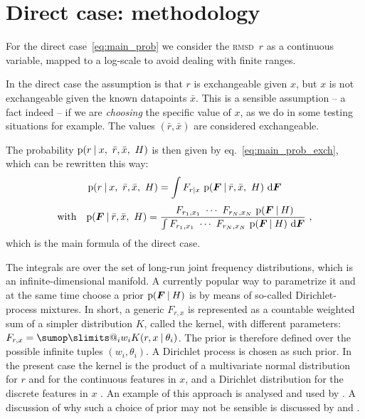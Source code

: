 \documentclass[\ifafour a4paper,12pt,\else a5paper,10pt,\fi%
onecolumn,oneside,article,%
british%
]{memoir}
\makeatletter
\theoremstyle{remark}
\theoremstyle{innote}
\def\sum{\DOTSI\sumop\slimits@}
\newcommand*{\di}{\mathrm{d}}%
\newcommand*{\p}{\mathrm{p}}%
\renewcommand*{\|}[1][]{\nonscript\:#1\vert\nonscript\:\mathopen{}}
\renewcommand*{\=}{\TextOrMath\texteq\eq}
\newcommand*{\sect}{\S}%
\newcommand*{\eqn}{eq.}%
\newcommand*{\rmsd}{\textsc{rmsd}}
\newcommand*{\ro}{r}
\newcommand*{\xo}{x}
\newcommand*{\br}{\bar{r}}
\newcommand*{\bx}{\bar{x}}
\newcommand*{\yF}{\bm{F}}
\makeatother
\begin{document}
\section{Direct case: methodology}
\label{sec:direct_method}

For the direct case~\eqref{eq:main_prob} we consider the \rmsd\ $r$ as a
continuous variable, mapped to a log-scale to avoid dealing with finite
ranges.

In the direct case the assumption is that $\ro$ is exchangeable given
$\xo$, but $\xo$ is not exchangeable given the known datapoints $\bx$.
This is a sensible assumption -- a fact indeed -- if we are \emph{choosing}
the specific value of $\xo$, as we do in some testing situations for
example. The values $(\br,\bx)$ are considered exchangeable.

The probability $\p(\ro \| \xo,\ \br,\bx,\ H)$ is then given by
\eqn~\eqref{eq:main_prob_exch}, which can be rewritten this way:
\begin{equation}
  \label{eq:direct_case_main}
  \begin{gathered}
  \p(\ro \| \xo,\ \br,\bx,\ H) =
  \int F_{\ro\|\xo} \ \p(\yF \| \br, \bx,\ H)\ \di\yF
  \\[\jot]
  \text{with}\quad
  \p(\yF \| \br, \bx,\ H) =
  \frac{
    \ F_{r_{1},x_{1}} \  \dotsm \ 
  F_{r_{N},x_{N}} \ \p(\yF \| H)
  }{
    \int F_{r_{1},x_{1}} \  \dotsm \ 
  F_{r_{N},x_{N}} \ \p(\yF \| H)\ \di\yF
  }  \ ,
\end{gathered}
\end{equation}
which is the main formula of the direct case.

The integrals are over the set of long-run joint frequency distributions,
which is an infinite-dimensional manifold. A currently popular way to
parametrize it and at the same time choose a prior $\p(\yF \| H)$ is by
means of so-called Dirichlet-process mixtures. In short, a generic
$F_{r,x}$ is represented as a countable weighted sum of a simpler
distribution $K$, called the kernel, with different parameters:
$F_{r,x} = \sum_{i}w_{i} K(r,x \| \theta_{i})$. The prior is therefore
defined over the possible infinite tuples $(w_{i},\theta_{i})$. A Dirichlet
process is chosen as such prior. In the present case the kernel is the
product of a multivariate normal distribution for $r$ and for the
continuous features in $x$, and a Dirichlet distribution for the discrete
features in $x$ \parencites[\sect~3.3]{liveranietal2015}. An example of
this approach is analysed and used by \textcites{muelleretal1996}. A
discussion of why such a choice of prior may not be sensible is discussed
by \textcite{petrone2017} and \textcite[\sect~4]{quintanaetal2020}.
\end{document}
